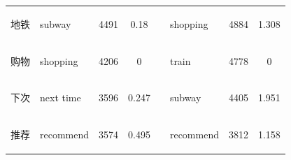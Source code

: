 \documentclass[smallextended,natbib]{svjour3}       %
\providecommand{\DIFdelbegin}{} %
\providecommand{\DIFaddendFL}{} %
\newcommand{\DIFscaledelfig}{0.5}
\newlength{\DIFdelgraphicswidth} %
\newlength{\DIFdelgraphicsheight} %
\newcommand{\DIFdelincludegraphics}[2][]{%
\sbox{\DIFdelgraphicsbox}{\DIFOincludegraphics[#1]{#2}}%
\settoboxwidth{\DIFdelgraphicswidth}{\DIFdelgraphicsbox} %
\settoboxtotalheight{\DIFdelgraphicsheight}{\DIFdelgraphicsbox} %
\scalebox{\DIFscaledelfig}{%
\parbox[b]{\DIFdelgraphicswidth}{\usebox{\DIFdelgraphicsbox}\\[-\baselineskip] \rule{\DIFdelgraphicswidth}{0em}}\llap{\resizebox{\DIFdelgraphicswidth}{\DIFdelgraphicsheight}{%
\setlength{\unitlength}{\DIFdelgraphicswidth}%
\begin{picture}(1,1)%
\thicklines\linethickness{2pt} %
{\color[rgb]{1,0,0}\put(0,0){\framebox(1,1){}}}%
{\color[rgb]{1,0,0}\put(0,0){\line( 1,1){1}}}%
{\color[rgb]{1,0,0}\put(0,1){\line(1,-1){1}}}%
\end{picture}%
}\hspace*{3pt}}} %
} %
\DeclareRobustCommand{\DIFdelbegin}{\DIFOdelbegin \let\includegraphics\DIFdelincludegraphics} %
\DeclareRobustCommand{\DIFaddendFL}{\DIFOaddendFL \let\includegraphics\DIFOincludegraphics} %
\begin{document}
\begin{table}[h]
{\begin{tabular}{|c|l|c|c|l|l|c|c|}
\begin{CJK}{UTF8}{gbsn} 地铁 \end{CJK}            & subway                                    & 4491               & 0.18                &                                & shopping                           & 4884               & 1.308               \\ \cline{1-4} \cline{6-8} 
\begin{CJK}{UTF8}{gbsn} 购物 \end{CJK}            & shopping                                  & 4206               & 0                   &                                & train                              & 4778               & 0                   \\ \cline{1-4} \cline{6-8} 
\begin{CJK}{UTF8}{gbsn} 下次 \end{CJK}            & next time                                 & 3596               & 0.247               &                                & subway                             & 4405               & 1.951               \\ \cline{1-4} \cline{6-8} 
\begin{CJK}{UTF8}{gbsn} 推荐 \end{CJK}            & recommend                                 & 3574               & 0.495               &                                & recommend                          & 3812               & 1.158               \\ \cline{1-4} \cline{6-8} 
\end{tabular}%
}
\DIFaddendFL \end{table}


\DIFdelbegin %
\end{document}
